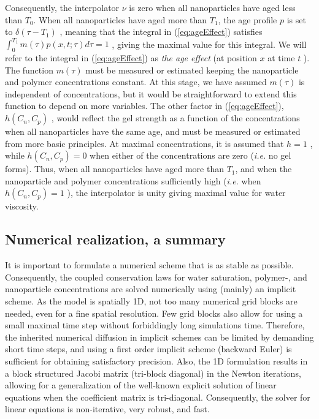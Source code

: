 \documentclass[nanomaterials,article,submit,moreauthors,pdftex]{Definitions/mdpi}
\begin{document}
Consequently, the interpolator  $\nu$ is zero when all nanoparticles have aged less than  $T_0$. When all nanoparticles have aged more than  $T_1$, the age profile $p$ is set to  $\delta(\tau-T_1)$ , meaning that the integral in (\ref{eq:ageEffect}) satisfies $\int^{T_1}_{0}m(\tau)p(x,t;\tau)d\tau=1$ , giving the maximal value for this integral. We will refer to the integral in (\ref{eq:ageEffect})  as \textit{the age effect} (at position $x$ at time $t$ ). The function $m(\tau)$ must be measured or estimated keeping the nanoparticle and polymer concentrations constant. At this stage, we have assumed  $m(\tau)$ is independent of concentrations, but it would be straightforward to extend this function to depend on more variables. The other factor in (\ref{eq:ageEffect}), $h(C_n,C_p)$ , would reflect the gel strength as a function of the concentrations when all nanoparticles have the same age, and must be measured or estimated from more basic principles. At maximal concentrations, it is assumed that $h=1$ , while $h(C_n,C_p)=0$ when either of the concentrations are zero (\textit{i.e.} no gel forms). Thus, when all nanoparticles have aged more than $T_1$, and when the nanoparticle and polymer concentrations sufficiently high (\textit{i.e.} when $h(C_n,C_p)=1$ ), the interpolator is unity giving maximal value for water viscosity.

\subsection{Numerical realization, a summary}
It is important to formulate a numerical scheme that is as stable as possible. Consequently, the coupled conservation laws for water saturation, polymer-, and nanoparticle concentrations are solved numerically using (mainly) an implicit scheme. As the model is spatially 1D, not too many numerical grid blocks are needed, even for a fine spatial resolution. Few grid blocks also allow for using a small maximal time step without forbiddingly long simulations time. Therefore, the inherited numerical diffusion in implicit schemes can be limited by demanding short time steps, and using a first order implicit scheme (backward Euler) is sufficient for obtaining satisfactory precision. Also, the 1D formulation results in a block structured Jacobi matrix (tri-block diagonal) in the Newton iterations, allowing for a generalization of the well-known explicit solution of linear equations when the coefficient matrix is tri-diagonal. Consequently, the solver for linear equations is non-iterative, very robust, and fast. 
\end{document}
